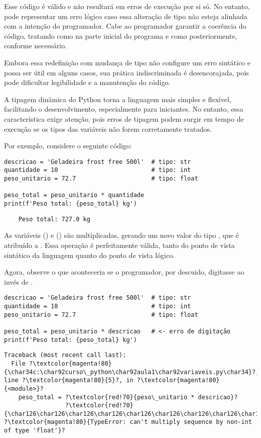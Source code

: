 Esse código é válido e não resultará em erros de execução por si só.
No entanto, pode representar um erro lógico caso essa alteração de tipo não esteja alinhada com a intenção do programador.
Cabe ao programador garantir a coerência do
código, tratando  como  na parte inicial do programa e como
 posteriormente, conforme necessário.

Embora essa redefinição com mudança de tipo não configure um erro sintático e possa ser útil em alguns casos, sua
prática indiscriminada é desencorajada, pois pode dificultar legibilidade e a manutenção do código.

A tipagem dinâmica do Python torna a linguagem mais simples e flexível, facilitando o desenvolvimento, especialmente
para iniciantes.
No entanto, essa característica exige atenção, pois erros de tipagem podem surgir em tempo de execução se os tipos
das variáveis não forem corretamente tratados.


Por exemplo, considere o seguinte código:
\begin{verbatim}
descricao = 'Geladeira frost free 500l'  # tipo: str
quantidade = 10                          # tipo: int
peso_unitario = 72.7                     # tipo: float

peso_total = peso_unitario * quantidade
print(f'Peso total: {peso_total} kg')
\end{verbatim}
%
\begin{verbatim}
    Peso total: 727.0 kg
\end{verbatim}

As variáveis  () e  () são multiplicadas, gerando
um novo valor do tipo , que é atribuído a .
Essa operação é perfeitamente válida, tanto do ponto de vista sintático da linguagem quanto do ponto de vista lógico.

Agora, observe o que aconteceria se o programador, por descuido, digitasse  ao invés
de .
\begin{verbatim}
descricao = 'Geladeira frost free 500l'  # tipo: str
quantidade = 10                          # tipo: int
peso_unitario = 72.7                     # tipo: float

peso_total = peso_unitario * descricao   # <- erro de digitação
print(f'Peso total: {peso_total} kg')
\end{verbatim}
%
\begin{verbatim}
Traceback (most recent call last):
  File ?\textcolor{magenta!80}{\char34c:\char92curso\_python\char92aula1\char92variaveis.py\char34}?, line ?\textcolor{magenta!80}{5}?, in ?\textcolor{magenta!80}{<module>}?
    peso_total = ?\textcolor{red!70}{peso\_unitario * descricao}?
                 ?\textcolor{red!70}{\char126\char126\char126\char126\char126\char126\char126\char126\char126\char126\char126\char126\char126\char126\char94\char126\char126\char126\char126\char126\char126\char126\char126\char126\char126}?
?\textcolor{magenta!80}{TypeError: can't multiply sequence by non-int of type 'float'}?
\end{verbatim}

